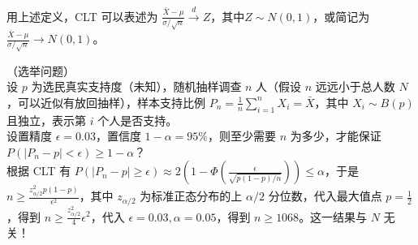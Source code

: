 \documentclass[../main.tex]{subfiles}
\begin{document}
用上述定义，CLT 可以表述为 $\frac{\bar X-\mu}{\sigma/\sqrt n}\overset{d}\rightarrow Z$，其中$Z\sim N(0,1)$，或简记为 $\frac{\bar X-\mu}{\sigma/\sqrt n}\rightarrow N(0,1)$。

\begin{example}
    （选举问题）\\
    设 $p$ 为选民真实支持度（未知），随机抽样调查 $n$ 人（假设 $n$ 远远小于总人数 $N$，可以近似有放回抽样），样本支持比例 $P_n=\frac1n\sum_{i=1}^nX_i=\bar X$，其中 $X_i\sim B(p)$ 且独立，表示第 $i$ 个人是否支持。\\
    设置精度 $\epsilon=0.03$，置信度 $1-\alpha=95\%$，则至少需要 $n$ 为多少，才能保证 $P(|P_n-p|<\epsilon)\geq1-\alpha$？\\
    根据 CLT 有 $P(|P_n-p|\geq\epsilon)\approx2\left(1-\Phi(\frac\epsilon{\sqrt{p(1-p)/n}})\right)\leq\alpha$，于是 $n\geq\frac{z_{\alpha/2}^2p(1-p)}{\epsilon^2}$，其中 $z_{\alpha/2}$ 为标准正态分布的上 $\alpha/2$ 分位数，代入最大值点 $p=\frac12$，得到 $n\geq\frac{z_{\alpha/2}^2}4\epsilon^2$，代入 $\epsilon=0.03,\alpha=0.05$，得到 $n\geq1068$。这一结果与 $N$ 无关！
\end{example}
\end{document}

